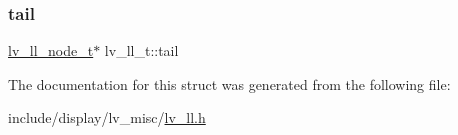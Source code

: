 \mbox{\label{structlv__ll__t_a633fc5158edd17d0e02f108a6fe042ad}} 
\subsubsection{\texorpdfstring{tail}{tail}}
{\footnotesize\ttfamily \mbox{\hyperlink{lv__ll_8h_aaaf22c8c1939f8ea17c80be0b1e9f299}{lv\+\_\+ll\+\_\+node\+\_\+t}}$\ast$ lv\+\_\+ll\+\_\+t\+::tail}



The documentation for this struct was generated from the following file\+:\begin{DoxyCompactItemize}
\item 
include/display/lv\+\_\+misc/\mbox{\hyperlink{lv__ll_8h}{lv\+\_\+ll.\+h}}\end{DoxyCompactItemize}

